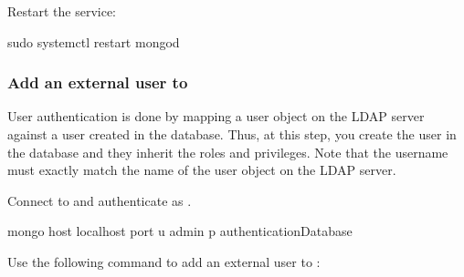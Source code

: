 \documentclass[letterpaper,10pt,english]{sphinxmanual}
\begin{document}
\sphinxAtStartPar
Restart the  service:

\begin{sphinxVerbatim}[commandchars=\\\{\}]
\PYGZdl{} sudo systemctl restart mongod
\end{sphinxVerbatim}


\subsubsection{Add an external user to }
\label{\detokenize{sasl-auth:add-an-external-user-to-psmdb}}
\sphinxAtStartPar
User authentication is done by mapping a user object on the LDAP server against a user created in the  database. Thus, at this step, you create the user in the  database and they inherit the roles and privileges. Note that the username must exactly match the name of the user object on the LDAP server.

\sphinxAtStartPar
Connect to  and authenticate as {\hyperref[\detokenize{sasl-auth:root-user}]{}}.

\begin{sphinxVerbatim}[commandchars=\\\{\}]
\PYGZdl{} mongo \PYGZhy{}\PYGZhy{}host localhost \PYGZhy{}\PYGZhy{}port  \PYGZhy{}u admin \PYGZhy{}p  \PYGZhy{}\PYGZhy{}authenticationDatabase 
\end{sphinxVerbatim}

\sphinxAtStartPar
Use the following command to add an external user to :

\begin{sphinxVerbatim}[commandchars=\\\{\}]
\PYG{p}{[}\PYG{p}{]}
\end{sphinxVerbatim}
\end{document}
